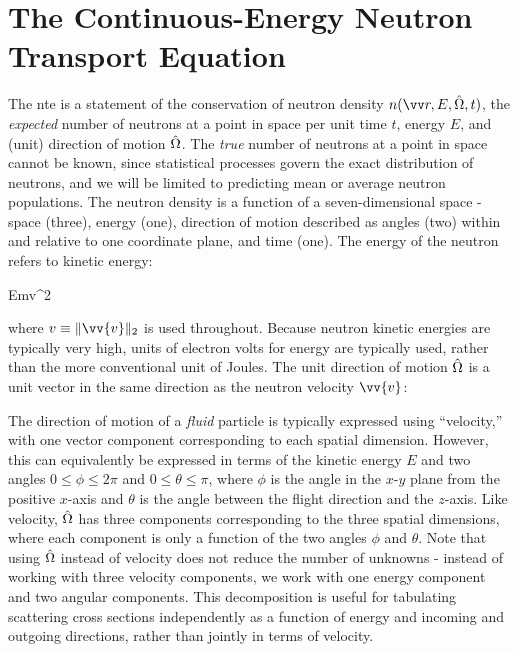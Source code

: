 \section{The Continuous-Energy Neutron Transport Equation}
\label{sec:CE_NTE}

The \gls{nte} is a statement of the conservation of neutron density \(n\seat\), the {\it expected} number of neutrons at a point in space per unit time \(t\), energy \(E\), and (unit) direction of motion \(\hat{\Omega}\). The {\it true} number of neutrons at a point in space cannot be known, since statistical processes govern the exact distribution of neutrons, and we will be limited to predicting mean or average neutron populations. The neutron density is a function of a seven-dimensional space - space (three), energy (one), direction of motion described as angles (two) within and relative to one coordinate plane, and time (one). The energy of the neutron refers to kinetic energy:

\beq
\label{eq:KineticEnergyDef}
E\equiv{}mv^2
\eeq

where \(v\equiv\|\vv{v}\|_2\) is used throughout. Because neutron kinetic energies are typically very high, units of electron volts for energy are typically used, rather than the more conventional unit of Joules. The unit direction of motion \(\hat{\Omega}\) is a unit vector in the same direction as the neutron velocity \(\vv{v}\):

\beq
\label{eq:OmegaDef}
\hO\equiv {}
\eeq

The direction of motion of a {\it fluid} particle is typically expressed using ``velocity,'' with one vector component corresponding to each spatial dimension. However, this can equivalently be expressed in terms of the kinetic energy \(E\) and two angles \(0\leq\phi\leq2\pi\) and \(0\leq\theta\leq\pi\), where \(\phi\) is the angle in the \(x\)-\(y\) plane from the positive \(x\)-axis and \(\theta\) is the angle between the flight direction and the \(z\)-axis. Like velocity, \(\hat{\Omega}\) has three components corresponding to the three spatial dimensions, where each component is only a function of the two angles \(\phi\) and \(\theta\). Note that using \(\hat{\Omega}\) instead of velocity does not reduce the number of unknowns - instead of working with three velocity components, we work with one energy component and two angular components. This decomposition is useful for tabulating scattering cross sections independently as a function of energy and incoming and outgoing directions, rather than jointly in terms of velocity.

